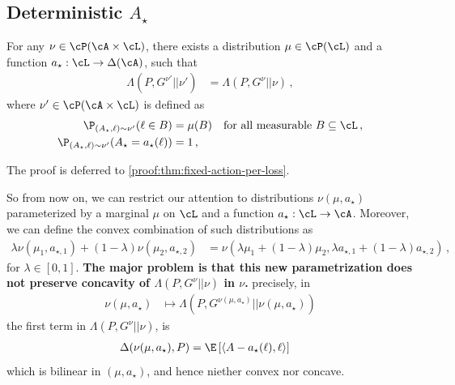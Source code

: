 \subsection{Deterministic \texorpdfstring{$A_\star$}{A\_star}}
\begin{theorem}
    \label{thm:fixed-action-per-loss}
    For any $\nu \in \cP(\cA \times \cL)$, there exists
    a distribution $\mu \in \cP(\cL)$
    and a function $a_\star: \cL \to \Delta(\cA)$,
    such that
    \begin{align*}
        \Lambda(P, G^{\nu'} || \nu')
         & =
        \Lambda(P, G^{\nu} || \nu)\,,
    \end{align*}
    where $\nu' \in \cP(\cA \times \cL)$ is defined as
    \begin{align*}
        \P_{(A_\star, \ell) \sim \nu'}(\ell \in B)              & =
        \mu(B) \quad \text{for all measurable $B \subseteq \cL$}\,,      \\
        \P_{(A_\star, \ell) \sim \nu'}(A_\star = a_\star(\ell)) & = 1\,,
    \end{align*}
\end{theorem}
\noindent The proof is deferred to \ref{proof:thm:fixed-action-per-loss}.

So from now on, we can restrict our attention to distributions
$\nu(\mu, a_\star)$ parameterized by a marginal $\mu$ on $\cL$
and a function $a_\star: \cL \to \cA$.
Moreover, we can define the convex combination of such distributions as
\begin{align}
    \lambda \nu(\mu_1, a_{\star,1}) + (1-\lambda) \nu(\mu_2, a_{\star,2})
     & =
    \nu(\lambda \mu_1 + (1-\lambda) \mu_2, \lambda a_{\star,1} + (1-\lambda) a_{\star,2})\,,
    \label{eq:convex-combination-no-marginal}
\end{align}
for $\lambda \in [0,1]$.
\textbf{The major problem is that this new parametrization does not preserve concavity
    of $\Lambda(P, G^{\nu} || \nu)$ in $\nu$.}
precisely, in
\begin{align*}
    \nu(\mu, a_\star)
     & \mapsto
    \Lambda(P, G^{\nu(\mu, a_\star)} || \nu(\mu, a_\star))
\end{align*}
the first term in $\Lambda(P, G^{\nu} || \nu)$, is
\begin{align*}
    \Delta(\nu(\mu, a_\star), P)
     & =
    \E\left[
        \left\langle
        A - a_\star(\ell),
        \ell
        \right\rangle
        \right]
\end{align*}
which is bilinear in $(\mu, a_\star)$, and hence niether convex nor concave.

